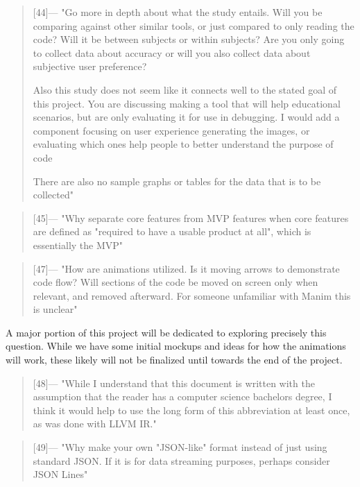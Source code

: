 \begin{quotation} [44]---%
  "Go more in depth about what the study entails. Will you be comparing against other similar tools, or just compared to only reading the code? Will it be between subjects or within subjects? Are you only going to collect data about accuracy or will you also collect data about subjective user preference?
  
  Also this study does not seem like it connects well to the stated goal of this project. You are discussing making a tool that will help educational scenarios, but are only evaluating it for use in debugging. I would add a component focusing on user experience generating the images, or evaluating which ones help people to better understand the purpose of code

  There are also no sample graphs or tables for the data that is to be collected"
\end{quotation}

\begin{quotation} [45]---%
  "Why separate core features from MVP features when core features are defined as "required to have a usable product at all", which is essentially the MVP"
\end{quotation}

\begin{quotation} [47]---%
  "How are animations utilized. Is it moving arrows to demonstrate code flow? Will sections of the code be moved on screen only when relevant, and removed afterward. For someone unfamiliar with Manim this is unclear"
\end{quotation}
\noindent A major portion of this project will be dedicated to exploring precisely this question. While we have some initial mockups and ideas for how the animations will work, these likely will not be finalized until towards the end of the project.

\begin{quotation} [48]---%
  "While I understand that this document is written with the assumption that the reader has a computer science bachelors degree, I think it would help to use the long form of this abbreviation at least once, as was done with LLVM IR."
\end{quotation}

\begin{quotation} [49]---%
  "Why make your own "JSON-like" format instead of just using standard JSON. If it is for data streaming purposes, perhaps consider JSON Lines"
\end{quotation}

